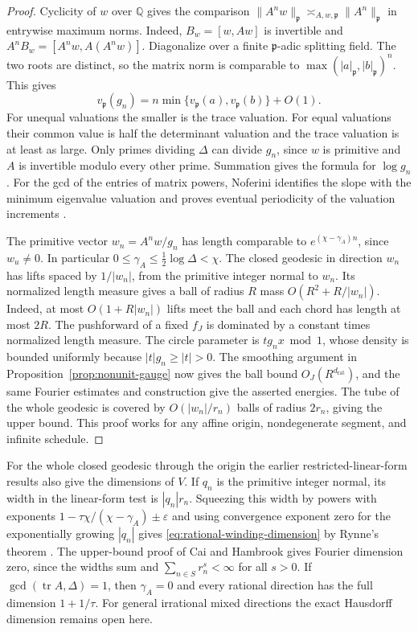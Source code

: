 \documentclass[11pt,a4paper,reqno]{amsart}
\theoremstyle{definition}
\theoremstyle{remark}
\numberwithin{equation}{section}
\begin{document}
\begin{proof}
Cyclicity of \(w\) over \(\mathbb Q\) gives the comparison
\(\|A^n w\|_{\mathfrak p}\asymp_{A,w,\mathfrak p}
\|A^n\|_{\mathfrak p}\) in entrywise maximum norms.
Indeed, \(B_w=[w,Aw]\) is invertible and
\(A^n B_w=[A^nw,A(A^nw)]\).
Diagonalize over a finite \(\mathfrak p\)-adic splitting field.
The two roots are distinct, so the matrix norm is comparable
to \(\max(|a|_{\mathfrak p},|b|_{\mathfrak p})^n\).
This gives
\[
 v_{\mathfrak p}(g_n)
 =n\min\{v_{\mathfrak p}(a),v_{\mathfrak p}(b)\}+O(1).
\]
For unequal valuations the smaller is the trace valuation.
For equal valuations their common value is half the determinant
valuation and the trace valuation is at least as large.
Only primes dividing \(\Delta\) can divide \(g_n\), since \(w\)
is primitive and \(A\) is invertible modulo every other prime.
Summation gives the formula for \(\log g_n\). For the gcd of the
entries of matrix powers, Noferini identifies the slope with the
minimum eigenvalue valuation and proves eventual periodicity of the
valuation increments \cite[Theorems~2.4--2.5]{Noferini}.

The primitive vector \(w_n=A^nw/g_n\) has length comparable
to \(e^{(\chi-\gamma_A)n}\), since \(w_u\ne0\). In particular
\(0\le\gamma_A\le\tfrac12\log\Delta<\chi\).
The closed geodesic in direction \(w_n\) has lifts spaced by
\(1/|w_n|\), from the primitive integer normal to \(w_n\).
Its normalized length measure gives a ball of radius \(R\)
mass \(O(R^2+R/|w_n|)\). Indeed, at most
\(O(1+R|w_n|)\) lifts meet the ball and each chord has length
at most \(2R\).
The pushforward of a fixed \(f_J\) is dominated by a constant
times normalized length measure. The circle parameter is
\(t g_n x\bmod 1\), whose density is bounded uniformly because
\(|t|g_n\ge |t|>0\). The smoothing argument in
Proposition~\ref{prop:nonunit-gauge} now gives the ball bound
\(O_J(R^{d_{\mathrm{rat}}})\), and the same Fourier estimates
and construction give the asserted energies. The tube of the
whole geodesic is covered by \(O(|w_n|/r_n)\) balls of radius
\(2r_n\), giving the upper bound. This proof works for any affine
origin, nondegenerate segment, and infinite schedule.
\end{proof}

For the whole closed geodesic through the origin the earlier
restricted-linear-form results also give the dimensions of \(V\).
If \(q_n\) is the primitive integer normal, its width in the
linear-form test is \(|q_n|r_n\). Squeezing this width by powers
with exponents \(1-\tau\chi/(\chi-\gamma_A)\pm\varepsilon\)
and using convergence exponent zero for the exponentially
growing \(|q_n|\) gives
\eqref{eq:rational-winding-dimension} by Rynne's theorem
\cite[p.~70]{Rynne}. The upper-bound proof of Cai and Hambrook
\cite[Theorem~1.4.1 and \S3.3]{CH} gives Fourier dimension zero, since
the widths sum and \(\sum_{n\in S}r_n^s<\infty\) for all \(s>0\).
If \(\gcd(\operatorname{tr}A,\Delta)=1\), then \(\gamma_A=0\)
and every rational direction has the full dimension \(1+1/\tau\).
For general irrational mixed directions the exact Hausdorff
dimension remains open here.
\end{document}
